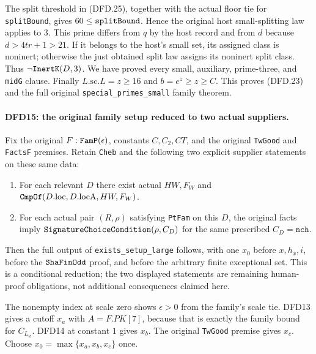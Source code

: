 \documentclass[11pt,a4paper]{article}
\numberwithin{equation}{section}
\theoremstyle{remark}\newtheorem{remark}[theorem]{Remark}
\begin{document}
The split threshold in (DFD.25), together with the actual
floor tie for \texttt{split\allowbreak Bound}, gives
$60\le\texttt{split\allowbreak Bound}$. Hence the original host
small-splitting law applies to $3$. This prime differs
from $q$ by the host record and from $d$ because
$d>4tr+1>21$. If it belongs to the host's small set, its
assigned class is noninert; otherwise the just obtained
split law assigns its noninert split class. Thus
$\neg\texttt{Inert\allowbreak K}(D,3)$. We have proved every small,
auxiliary, prime-three, and \texttt{mid\allowbreak G} clause.
Finally $L.\mathrm{sc}.L=z\ge16$ and
$b=e^z\ge z\ge C$. This proves (DFD.23) and the full
original \texttt{special\_\allowbreak primes\_\allowbreak small} family theorem.

\paragraph{DFD15: the original family setup reduced to two actual suppliers.}
\label{claim:DFD15}
Fix the original $F:\texttt{Fam\allowbreak P}(\epsilon)$, constants
$C,C_2,CT$, and the original \texttt{Tw\allowbreak Good} and
\texttt{Facts\allowbreak F} premises. Retain \texttt{Cheb} and the
following two explicit supplier statements on these same
data:
\begin{enumerate}
\item For each relevant $D$ there exist actual $HW,F_W$
and $\texttt{Cmp\allowbreak Of}(D.\mathrm{loc},D.\mathrm{locA},HW,F_W)$.
\item For each actual pair $(R,\rho)$ satisfying
\texttt{Pt\allowbreak Fam} on this $D$, the original facts imply
$\texttt{Signature\allowbreak Choice\allowbreak Condition}(\rho,C_D)$ for the
same prescribed $C_D=\texttt{nch}$.
\end{enumerate}
Then the full output of \texttt{exists\_\allowbreak setup\_\allowbreak large}
follows, with one $x_0$ before $x,h_x,i$, before the
$\texttt{Sha\allowbreak Fin\allowbreak Odd}$ proof, and before the arbitrary
finite exceptional set. This is a conditional reduction;
the two displayed statements are remaining human-proof
obligations, not additional consequences claimed here.

The nonempty index at scale zero shows $\epsilon>0$
from the family's scale tie. DFD13 gives a cutoff $x_a$
with $A=F.PK[7]$, because that is exactly the family
bound for $C_{L_w}$. DFD14 at constant $1$ gives $x_b$.
The original \texttt{Tw\allowbreak Good} premise gives $x_c$.
Choose $x_0=\max\{x_a,x_b,x_c\}$ once.
\end{document}
